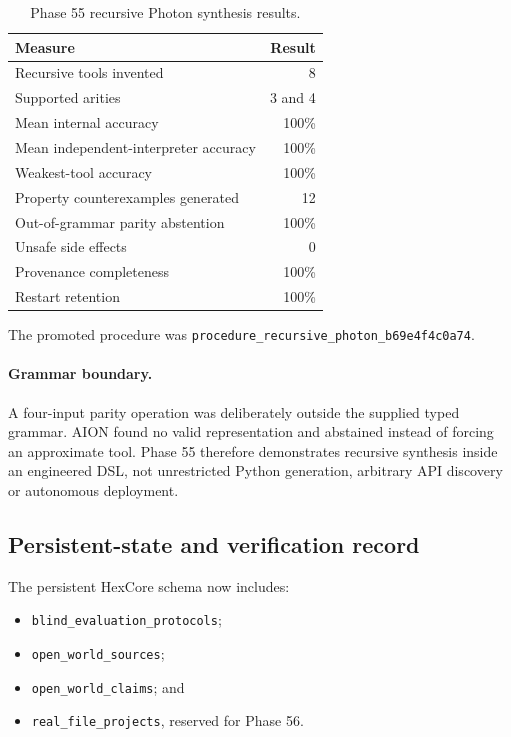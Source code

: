 \begin{table}[htbp]
\centering
\begin{tabular}{lr}
\hline
\textbf{Measure} & \textbf{Result}\\
\hline
Recursive tools invented & 8\\
Supported arities & 3 and 4\\
Mean internal accuracy & 100\%\\
Mean independent-interpreter accuracy & 100\%\\
Weakest-tool accuracy & 100\%\\
Property counterexamples generated & 12\\
Out-of-grammar parity abstention & 100\%\\
Unsafe side effects & 0\\
Provenance completeness & 100\%\\
Restart retention & 100\%\\
\hline
\end{tabular}
\caption{Phase 55 recursive Photon synthesis results.}
\label{tab:phase55-results}
\end{table}

The promoted procedure was
\texttt{procedure\_recursive\_photon\_b69e4f4c0a74}.

\paragraph{Grammar boundary.}
A four-input parity operation was deliberately outside the supplied typed
grammar.  AION found no valid representation and abstained instead of forcing
an approximate tool.  Phase 55 therefore demonstrates recursive synthesis
inside an engineered DSL, not unrestricted Python generation, arbitrary API
discovery or autonomous deployment.

\subsection{Persistent-state and verification record}

The persistent HexCore schema now includes:
\begin{itemize}
    \item \texttt{blind\_evaluation\_protocols};
    \item \texttt{open\_world\_sources};
    \item \texttt{open\_world\_claims}; and
    \item \texttt{real\_file\_projects}, reserved for Phase 56.
\end{itemize}

